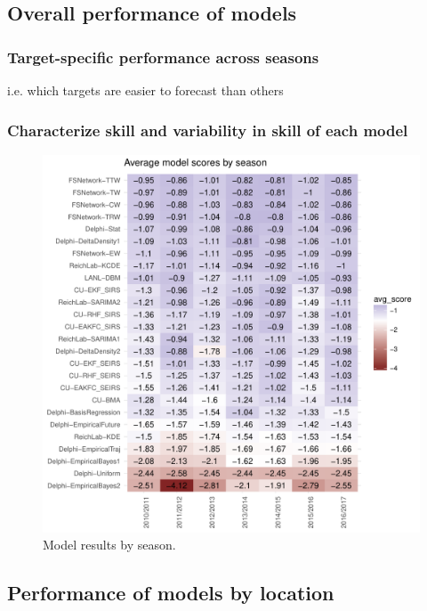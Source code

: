 \documentclass{article}
\begin{document}
\subsection{Overall performance of models}

\subsubsection{Target-specific performance across seasons}
i.e. which targets are easier to forecast than others

\subsubsection{Characterize skill and variability in skill of each model}

\begin{figure}[htbp]
\begin{center}
\includegraphics[width=\textwidth]{figures/fig1.pdf}
\caption{Model results by season.}
\label{fig:results-season}
\end{center}
\end{figure}

\subsection{Performance of models by location}
\end{document}
